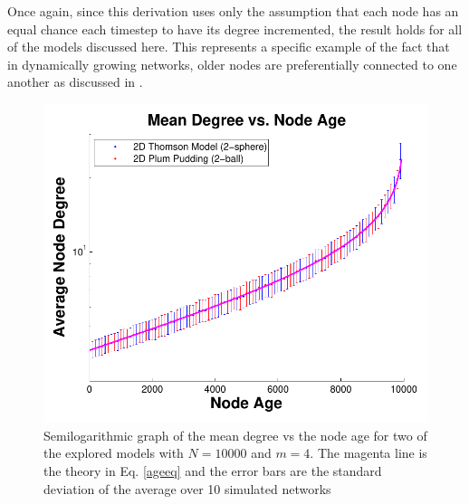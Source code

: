 \documentclass[aps,pre,reprint,superscriptaddress,amsmath,amssymb,nofootinbib]{revtex4-1}
\begin{document}
Once again, since this derivation uses only the assumption that each node has an equal chance each timestep to have its degree incremented, the result holds for all of the models discussed here.
This represents a specific example of the fact that in dynamically growing networks, older nodes are preferentially connected to one another as discussed in \cite{reallyrandom}.
\begin{figure}
\includegraphics[width=\linewidth]{figures/fig12.pdf}
\caption{\label{degage}Semilogarithmic graph of the mean degree vs the node age for two of the explored models with $N = 10000$ and $m = 4$. The magenta line is the theory in Eq. \eqref{ageeq} and the error bars are the standard deviation of the average over 10 simulated networks}
\end{figure}

\end{document}
